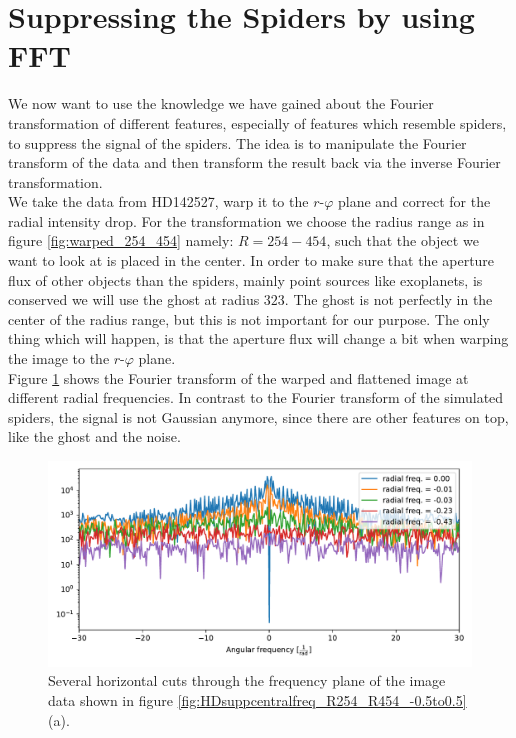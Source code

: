 \section{Suppressing the Spiders by using FFT}
We now want to use the knowledge we have gained about the Fourier transformation of different features, especially of features which resemble spiders, to suppress the signal of the spiders. The idea is to manipulate the Fourier transform of the data and then transform the result back via the inverse Fourier transformation.\\
We take the data from HD142527, warp it to the $r$-$\varphi$ plane and correct for the radial intensity drop. For the transformation we choose the radius range as in figure \ref{fig:warped_254_454} namely: $R=254-454$, such that the object we want to look at is placed in the center. In order to make sure that the aperture flux of other objects than the spiders, mainly point sources like exoplanets, is conserved we will use the ghost at radius $323$. The ghost is not perfectly in the center of the radius range, but this is not important for our purpose. The only thing which will happen, is that the aperture flux will change a bit when warping the image to the $r$-$\varphi$ plane.\\
Figure \ref{fig:rad0} shows the Fourier transform of the warped and flattened image at different radial frequencies. In contrast to the Fourier transform of the simulated spiders, the signal is not Gaussian anymore, since there are other features on top, like the ghost and the noise.
\begin{figure}[H]
	\centering
		\includegraphics[width=1.0\textwidth]{pics/rad0.pdf}
		\caption{Several horizontal cuts through the frequency plane of the image data shown in figure \ref{fig:HDsuppcentralfreq_R254_R454_-0.5to0.5}(a).}
		\label{fig:rad0}
\end{figure} 

